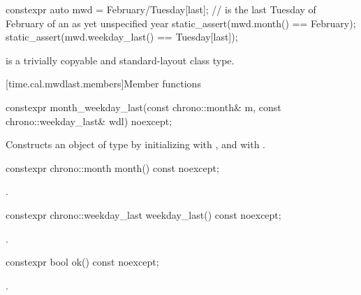 \pnum
\begin{example}
\begin{codeblock}
constexpr auto mwd
    = February/Tuesday[last];   //  is the last Tuesday of February of an as yet unspecified year
static_assert(mwd.month() == February);
static_assert(mwd.weekday_last() == Tuesday[last]);
\end{codeblock}
\end{example}

\pnum
{} is a trivially copyable and standard-layout class type.

[time.cal.mwdlast.members]{Member functions}

%
\begin{itemdecl}
constexpr month_weekday_last(const chrono::month& m,
                             const chrono::weekday_last& wdl) noexcept;
\end{itemdecl}

\begin{itemdescr}
\pnum
\effects
Constructs an object of type  by
initializing  with , and  with .
\end{itemdescr}

%
\begin{itemdecl}
constexpr chrono::month month() const noexcept;
\end{itemdecl}

\begin{itemdescr}
\pnum
\returns
{}.
\end{itemdescr}

%
\begin{itemdecl}
constexpr chrono::weekday_last weekday_last() const noexcept;
\end{itemdecl}

\begin{itemdescr}
\pnum
\returns
{}.
\end{itemdescr}

%
\begin{itemdecl}
constexpr bool ok() const noexcept;
\end{itemdecl}

\begin{itemdescr}
\pnum
\returns
{}.
\end{itemdescr}

